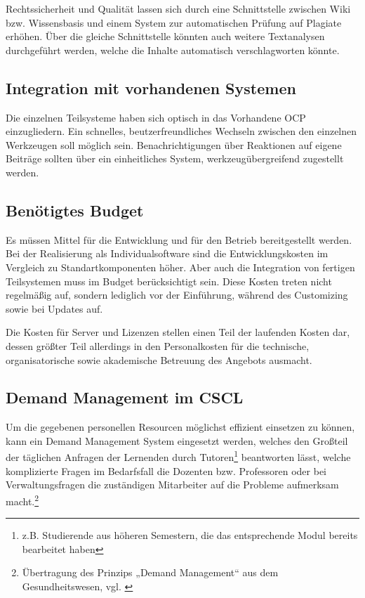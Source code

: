 Rechtssicherheit und Qualität lassen sich durch eine Schnittstelle zwischen Wiki bzw. Wissensbasis und einem System zur automatischen Prüfung auf Plagiate erhöhen. Über die gleiche Schnittstelle könnten auch weitere Textanalysen durchgeführt werden, welche die Inhalte automatisch verschlagworten könnte.

\subsection{Integration mit vorhandenen Systemen} %
\label{sub:integration_mit_vorhandenen_systemen}
Die einzelnen Teilsysteme haben sich optisch in das Vorhandene \ac{OCP} einzugliedern. Ein schnelles, beutzerfreundliches Wechseln zwischen den einzelnen Werkzeugen soll möglich sein. Benachrichtigungen über Reaktionen auf eigene Beiträge sollten über ein einheitliches System, werkzeugübergreifend zugestellt werden.

\subsection{Benötigtes Budget} %
\label{sub:benotigtes_budget}
Es müssen Mittel für die Entwicklung und für den Betrieb bereitgestellt werden. Bei der Realisierung als Individualsoftware sind die Entwicklungskosten im Vergleich zu Standartkomponenten höher. Aber auch die Integration von fertigen Teilsystemen muss im Budget berücksichtigt sein. Diese Kosten treten nicht regelmäßig auf, sondern lediglich vor der Einführung, während des Customizing sowie bei Updates auf.

Die Kosten für Server und Lizenzen stellen einen Teil der laufenden Kosten dar, dessen größter Teil allerdings in den Personalkosten für die technische, organisatorische sowie akademische Betreuung des Angebots ausmacht.


\subsection{Demand Management im CSCL} %
\label{sub:demand_management}
Um die gegebenen personellen Resourcen möglichst effizient einsetzen zu können, kann ein Demand Management System eingesetzt werden, welches den Großteil der täglichen Anfragen der Lernenden durch Tutoren\footnote{z.B. Studierende aus höheren Semestern, die das entsprechende Modul bereits bearbeitet haben} beantworten lässt, welche komplizierte Fragen im Bedarfsfall die Dozenten bzw. Professoren oder bei Verwaltungsfragen  die zuständigen Mitarbeiter auf die Probleme aufmerksam macht.\footnote{Übertragung des Prinzips „Demand Management“ aus dem Gesundheitswesen, vgl. \cite{gabler:demandmanagement}}

